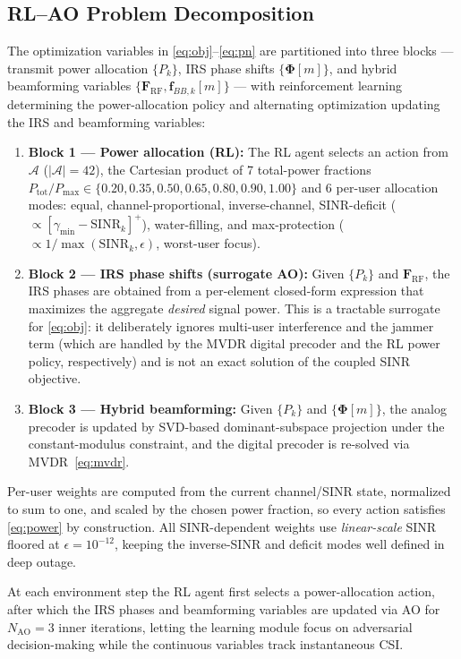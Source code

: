 \documentclass[10pt,conference]{IEEEtran}
\newcommand{\vect}[1]{\mathbf{#1}}
\newcommand{\mat}[1]{\mathbf{#1}}
\begin{document}
\subsection{RL--AO Problem Decomposition}

The optimization variables in \eqref{eq:obj}--\eqref{eq:pn} are partitioned into three blocks --- transmit power allocation $\{P_k\}$, IRS phase shifts $\{\boldsymbol{\Phi}[m]\}$, and hybrid beamforming variables $\{\mat{F}_{\mathrm{RF}},\vect{f}_{BB,k}[m]\}$ --- with reinforcement learning determining the power-allocation policy and alternating optimization updating the IRS and beamforming variables:
\begin{enumerate}
\item \textbf{Block 1 --- Power allocation (RL):} The RL agent selects an action from $\mathcal{A}$ ($|\mathcal{A}|=42$), the Cartesian product of 7 total-power fractions $P_{\mathrm{tot}}/P_{\max} \in \{0.20, 0.35, 0.50, 0.65, 0.80, 0.90, 1.00\}$ and 6 per-user allocation modes: equal, channel-proportional, inverse-channel, SINR-deficit ($\propto [\gamma_{\min} - \text{SINR}_k]^+$), water-filling, and max-protection ($\propto 1/\max(\text{SINR}_k,\epsilon)$, worst-user focus).
\item \textbf{Block 2 --- IRS phase shifts (surrogate AO):} Given $\{P_k\}$ and $\mat{F}_{\text{RF}}$, the IRS phases are obtained from a per-element closed-form expression that maximizes the aggregate \emph{desired} signal power. This is a tractable surrogate for \eqref{eq:obj}: it deliberately ignores multi-user interference and the jammer term (which are handled by the MVDR digital precoder and the RL power policy, respectively) and is not an exact solution of the coupled SINR objective.
\item \textbf{Block 3 --- Hybrid beamforming:} Given $\{P_k\}$ and $\{\bm{\Phi}[m]\}$, the analog precoder is updated by SVD-based dominant-subspace projection under the constant-modulus constraint, and the digital precoder is re-solved via MVDR~\eqref{eq:mvdr}.
\end{enumerate}

Per-user weights are computed from the current channel/SINR state, normalized to sum to one, and scaled by the chosen power fraction, so every action satisfies \eqref{eq:power} by construction. All SINR-dependent weights use \emph{linear-scale} SINR floored at $\epsilon = 10^{-12}$, keeping the inverse-SINR and deficit modes well defined in deep outage.

At each environment step the RL agent first selects a power-allocation action, after which the IRS phases and beamforming variables are updated via AO for $N_{\mathrm{AO}}=3$ inner iterations, letting the learning module focus on adversarial decision-making while the continuous variables track instantaneous CSI.
\end{document}
